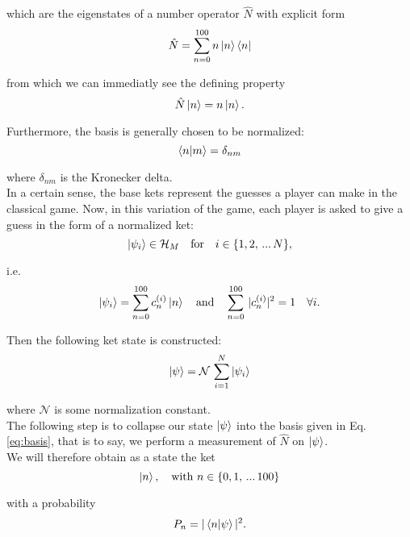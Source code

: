 which are the eigenstates of a number operator $\hat{N}$ with explicit form 
\begin{equation}
    \hat{N} = \sum_{n=0}^{100} n \ket{n}\bra{n}
\end{equation}

from which we can immediatly see the defining property
\begin{equation}
    \label{eq:number_operator}
    \hat{N}\ket{n} = n \ket{n}.
\end{equation}

Furthermore, the basis is generally chosen to be normalized:
\begin{equation}
    \label{eq:normalization}
    \braket{n|m} = \delta_{nm}
\end{equation}

where $\delta_{nm}$ is the Kronecker delta.\\

In a certain sense, the base kets represent the guesses a player can make in the classical game. Now, in this variation of the game, each player is asked to give a guess in the form of a normalized ket:
\begin{equation}
  \ket{\psi_i}\in\mathcal{H}_M \quad \text{for}\quad  i\in\{1,2,\,...\,N\},
\end{equation}

i.e.
\begin{equation}
    \ket{\psi_i} = \sum_{n=0}^{100} c_n^{(i)} \ket{n}\quad \text{and}\quad \sum_{n=0}^{100} \, |c_n^{(i)}|^2 = 1\quad \forall i.
\end{equation}

Then the following ket state is constructed:
\begin{equation}
\label{eq:game_ket}
  \ket{\psi}=\mathcal{N}\,\sum_{i=1}^{N}\ket{\psi_i}
\end{equation}

where $\mathcal{N}$ is some normalization constant.\\

The following step is to collapse our state $\ket{\psi}$ into the basis given in Eq. \ref{eq:basis}, that is to say, we perform a measurement of $\hat{N}$ on $\ket{\psi}$.\\

We will therefore obtain as a state the ket
\begin{equation}
  \ket{n},\quad \text{with }n\in\{0,1,\,...\,100\}
\end{equation}

with a probability
\begin{equation}
  P_n=|\braket{n|\psi}|^2.
\end{equation}

